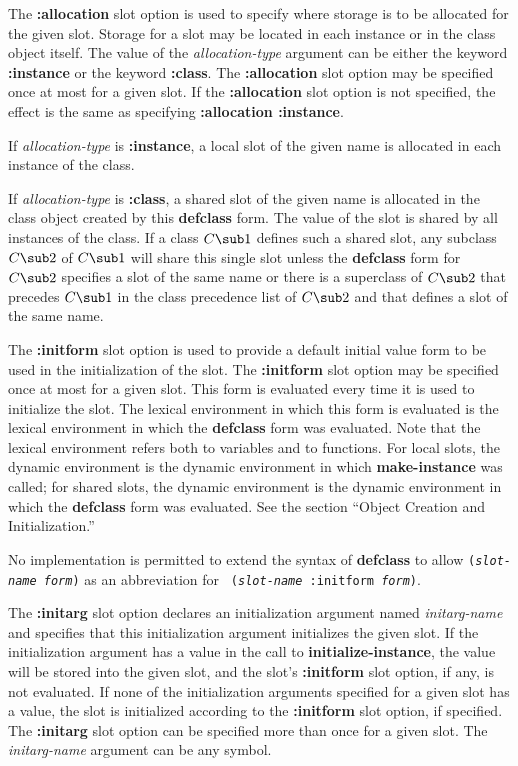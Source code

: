 \item{\bull} 
The {\bf :allocation} slot option is used to specify where storage is
to be allocated for the given slot.  Storage for a slot may be located
in each instance or in the class object itself.  The value of the {\it
allocation-type\/} argument can be either the keyword {\bf :instance}
or the keyword {\bf :class}.  The {\bf :allocation} slot option may be
specified once at most for a given slot.  If the {\bf :allocation}
slot option is not specified, the effect is the same as specifying
{\bf :allocation :instance}.

\itemitem{--}
If {\it allocation-type\/} is {\bf :instance}, a local slot of the given name
is allocated in each instance of the class.  

\itemitem{--}
If {\it allocation-type\/} is {\bf :class}, a shared slot of the given
name is allocated in the class object created by this {\bf defclass}
form.  The value of the slot is shared by all instances of the class.
If a class $C\sub1$ defines such a shared slot, any subclass $C\sub2$ of
$C\sub1$ will share this single slot unless the {\bf defclass} form
for $C\sub2$ specifies a slot of the same name or there is a
superclass of $C\sub2$ that precedes $C\sub1$ in the class precedence
list of $C\sub2$ and that defines a slot of the same name.

\item{\bull} The {\bf :initform} slot option is used to provide a default
initial value form to be used in the initialization of the slot.  The
{\bf :initform} slot option may be specified once at most for a given
slot.  This form is evaluated every time it is used to initialize the
slot.  The lexical
environment in which this form is evaluated is the lexical environment
in which the {\bf defclass} form was evaluated.  Note that the lexical
environment refers both to variables and to functions.  For local
slots, the dynamic environment is the dynamic environment in which
{\bf make-instance} was called; for shared slots, the dynamic
environment is the dynamic environment in which the {\bf defclass}
form was evaluated.  See the section ``Object Creation and
Initialization.''

No implementation is permitted to extend the syntax of {\bf defclass}
to allow {\tt ({\it slot-name form\/})} as an abbreviation for {\tt
({\it slot-name\/} :initform {\it form\/})}.

\item{\bull}
The {\bf :initarg} slot option declares an initialization argument
named {\it initarg-name\/} and specifies that this initialization argument
initializes the given slot.  If the initialization argument has a
value in the call to {\bf initialize-instance}, the value will be
stored into the given slot, and the slot's {\bf :initform} slot option, if
any, is not evaluated.  If none of the initialization arguments
specified for a given slot has a value, the slot is initialized
according to the {\bf :initform} slot option, if specified.  The {\bf
:initarg} slot option can be specified more than once for a given
slot.  The {\it initarg-name\/} argument can be any symbol.

